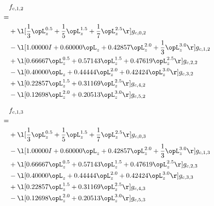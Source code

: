 \begin{alignat}{2} 
\label{eq:f_12_0} 
& f_{c,1,2} \nonumber \\ 
 = \\ 
& + \l[ \frac{1}{3} \opL_z^{0.5} + \frac{1}{5} \opL_z^{1.5} + \frac{1}{7} \opL_z^{2.5}  \r] g_{c,0,2} \nonumber \\ 
& - \l[  1.00000 I +  0.60000 \opL_z +  0.42857 \opL_z^{2.0} + \frac{1}{3} \opL_z^{3.0}  \r] g_{c,1,2} \nonumber \\ 
& + \l[  0.66667 \opL_z^{0.5} +  0.57143 \opL_z^{1.5} +  0.47619 \opL_z^{2.5}  \r] g_{c,2,2} \nonumber \\ 
& - \l[  0.40000 \opL_z +  0.44444 \opL_z^{2.0} +  0.42424 \opL_z^{3.0}  \r] g_{c,3,2} \nonumber \\ 
& + \l[  0.22857 \opL_z^{1.5} +  0.31169 \opL_z^{2.5}  \r] g_{c,4,2} \nonumber \\ 
& - \l[  0.12698 \opL_z^{2.0} +  0.20513 \opL_z^{3.0}  \r] g_{c,5,2} \nonumber \\ 
\end{alignat} 


\begin{alignat}{2} 
\label{eq:f_13_0} 
& f_{c,1,3} \nonumber \\ 
 = \\ 
& + \l[ \frac{1}{3} \opL_z^{0.5} + \frac{1}{5} \opL_z^{1.5} + \frac{1}{7} \opL_z^{2.5}  \r] g_{c,0,3} \nonumber \\ 
& - \l[  1.00000 I +  0.60000 \opL_z +  0.42857 \opL_z^{2.0} + \frac{1}{3} \opL_z^{3.0}  \r] g_{c,1,3} \nonumber \\ 
& + \l[  0.66667 \opL_z^{0.5} +  0.57143 \opL_z^{1.5} +  0.47619 \opL_z^{2.5}  \r] g_{c,2,3} \nonumber \\ 
& - \l[  0.40000 \opL_z +  0.44444 \opL_z^{2.0} +  0.42424 \opL_z^{3.0}  \r] g_{c,3,3} \nonumber \\ 
& + \l[  0.22857 \opL_z^{1.5} +  0.31169 \opL_z^{2.5}  \r] g_{c,4,3} \nonumber \\ 
& - \l[  0.12698 \opL_z^{2.0} +  0.20513 \opL_z^{3.0}  \r] g_{c,5,3} \nonumber \\ 
\end{alignat} 


